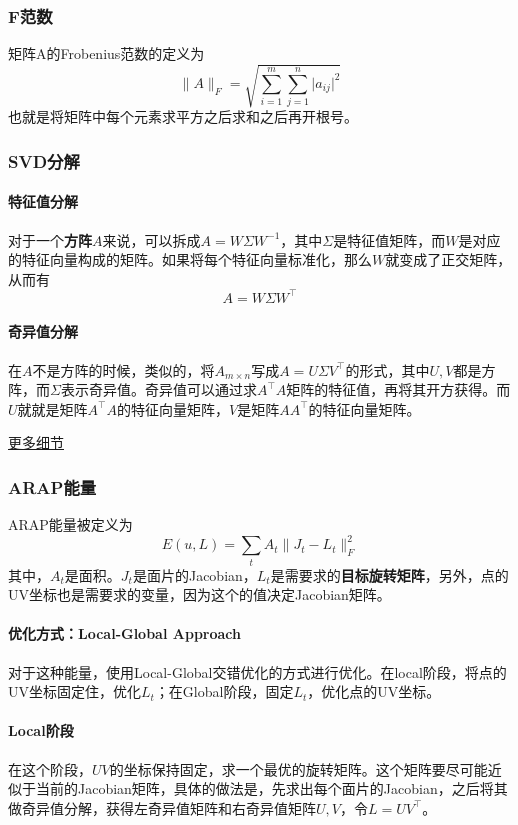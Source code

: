 \documentclass[a4paper]{D:/MyRepo/Script/latex/PaperReadingLog}
\begin{document}
\subsubsection{F范数}
矩阵$\mathrm{A}$的Frobenius范数的定义为
$$
\lVert A \lVert_F=\sqrt{\sum_{i=1}^m\sum_{j=1}^n\lvert a_{ij}\lvert^2}
$$
也就是将矩阵中每个元素求平方之后求和之后再开根号。

\subsubsection{SVD分解}
\paragraph{特征值分解}
对于一个\textbf{方阵}$A$来说，可以拆成$A=W \Sigma W^{-1}$，其中$\Sigma$是特征值矩阵，而$W$是对应的特征向量构成的矩阵。如果将每个特征向量标准化，那么$W$就变成了正交矩阵，从而有
$$
A=W \Sigma W^\top
$$
\paragraph{奇异值分解}
在$A$不是方阵的时候，类似的，将$A_{m\times n}$写成$A=U\Sigma V^\top$的形式，其中$U,V$都是方阵，而$\Sigma$表示奇异值。奇异值可以通过求$A^\top A$矩阵的特征值，再将其开方获得。而$U$就就是矩阵$A^\top A$的特征向量矩阵，$V$是矩阵$AA^\top$的特征向量矩阵。

\href{https://zhuanlan.zhihu.com/p/29846048}{更多细节}


\subsubsection{ARAP能量}
ARAP能量被定义为
$$
E(u,L)=\sum_tA_t\lVert J_t-L_t \lVert_F^2
$$
其中，$A_t$是面积。$J_t$是面片的Jacobian，$L_t$是需要求的\textbf{目标旋转矩阵}，另外，点的UV坐标也是需要求的变量，因为这个的值决定Jacobian矩阵。
\paragraph{优化方式：Local-Global Approach}
对于这种能量，使用Local-Global交错优化的方式进行优化。在local阶段，将点的UV坐标固定住，优化$L_t$；在Global阶段，固定$L_t$，优化点的UV坐标。

\paragraph{Local阶段}
在这个阶段，$UV$的坐标保持固定，求一个最优的旋转矩阵。这个矩阵要尽可能近似于当前的Jacobian矩阵，具体的做法是，先求出每个面片的Jacobian，之后将其做奇异值分解，获得左奇异值矩阵和右奇异值矩阵$U,V$，令$L=UV^\top$。
\end{document}
